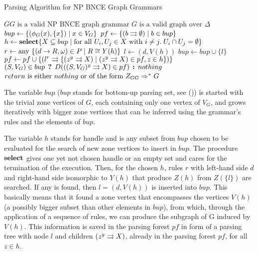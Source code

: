 \documentclass[]{report}
\begin{document}
\begin{algorithm}[!h]
	\caption{Parsing Algorithm for NP BNCE Graph Grammars}
	\begin{algorithmic}[!ht]
		\Require $GG \text{ is a valid NP BNCE graph grammar}$
		\Require $G \text{ is a valid graph over } \Delta$ 
			\State $bup \gets \{(\phi_G(x),\{x\}) \; | \; x \in V_G\}$ 
			\State $pf \gets \{ \ptree{b}{}{\emptyset} \st b \in bup \}$ 
			\Repeat
				\State $h \gets \text{\textbf{select}} \{X \subseteq bup \; | \;\text{for all } U_i, U_j \in X \text{ with } i \neq j . \; U_i \cap U_j = \emptyset \}$
				 
					\State $r \gets \text{any } \{(d \to R,\omega) \in P \; | \; R \cong Y(h) \}$
					\State $l \gets (d,V(h))$
						\State $bup \gets bup \cup \{l\}$ 
						\State $pf \gets pf \cup \{ \ptree{l}{r}{\{\ptree{z}{y}{X} \st \ptree{z}{y}{X} \in pf, z \in h \}} \}$
					\EndIf
				\EndFor
			 
			\State \Return $(S, V_G) \in bup \? D(\ptree{(S,V_G)}{y}{X} \in pf) \: nothing $
		\EndFunction
		\Ensure $return \text{ is either } nothing \text{ or of the form } \startG{GG} \derivtr{}{}{} G$
	\end{algorithmic}
	\label{alg:parse}
\end{algorithm}

The variable $bup$ ($bup$ stands for bottom-up parsing set, see ())%
is started with the trivial zone vertices of $G$, each containing only one vertex of $V_G$, and grows iteratively with bigger zone vertices that can be inferred using the grammar's rules and the elements of $bup$.

The variable $h$ stands for handle and is any subset from $bup$ chosen to be evaluated for the search of new zone vertices to insert in $bup$. The procedure $\textbf{select}$ gives one yet not chosen handle or an empty set and cares for the termination of the execution. Then, for the chosen $h$, rules $r$ with left-hand side $d$ and right-hand side isomorphic to $Y(h)$ that produce $Z(h)$ from $Z(\{l\})$ are searched. If any is found, then $l = (d,V(h))$ is inserted into $bup$. This basically means that it found a zone vertex that encompasses the vertices $V(h)$ (a possibly bigger subset than other elements in $bup$), from which, through the application of a sequence of rules, we can produce the subgraph of G induced by $V(h)$. This information is saved in the parsing forest $pf$ in form of a parsing tree with node $l$ and children $\ptree{z}{y}{X}$, already in the parsing forest $pf$, for all $z \in h$.
\end{document}
